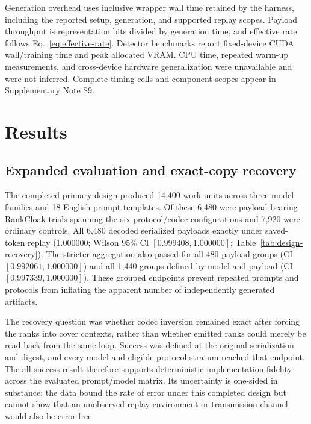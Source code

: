 \documentclass[fleqn,10pt]{wlscirep}
\begin{document}
Generation overhead uses inclusive wrapper wall time retained by the harness, including the reported setup, generation, and supported replay scopes. Payload throughput is representation bits divided by generation time, and effective rate follows Eq.~\eqref{eq:effective-rate}. Detector benchmarks report fixed-device CUDA wall/training time and peak allocated VRAM. CPU time, repeated warm-up measurements, and cross-device hardware generalization were unavailable and were not inferred. Complete timing cells and component scopes appear in Supplementary Note S9.




\section*{Results}\label{sec:results}

\subsection*{Expanded evaluation and exact-copy recovery}\label{sec:results-recovery}

The completed primary design produced 14,400 work units across three model families and 18 English prompt templates. Of these 6,480 were payload bearing RankCloak trials spanning the six protocol/codec configurations and 7,920 were ordinary controls. All 6,480 decoded serialized payloads exactly under saved-token replay (1.000000; Wilson 95\% CI \([0.999408, 1.000000]\); Table~\ref{tab:design-recovery}). The stricter aggregation also passed for all 480 payload groups (CI \([0.992061, 1.000000]\)) and all 1,440 groups defined by model and payload (CI \([0.997339, 1.000000]\)). These grouped endpoints prevent repeated prompts and protocols from inflating the apparent number of independently generated artifacts.

The recovery question was whether codec inversion remained exact after forcing the ranks into cover contexts, rather than whether emitted ranks could merely be read back from the same loop. Success was defined at the original serialization and digest, and every model and eligible protocol stratum reached that endpoint. The all-success result therefore supports deterministic implementation fidelity across the evaluated prompt/model matrix. Its uncertainty is one-sided in substance; the data bound the rate of error under this completed design but cannot show that an unobserved replay environment or transmission channel would also be error-free.
\end{document}
